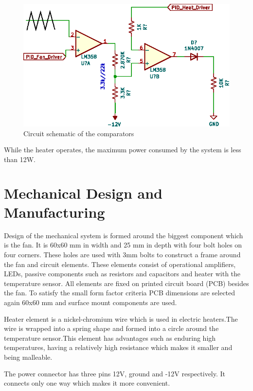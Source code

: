 \documentclass[conference]{IEEEtran}
\begin{document}
\begin{figure}[h]
\centerline{\includegraphics[scale=1]{figures/COMP.eps}}
\caption{Circuit schematic of the comparators}
\label{fanAND}
\end{figure}

While the heater operates, the maximum power consumed by the system is less than 12W.

\section{Mechanical Design and Manufacturing}
Design of the mechanical system is formed around the biggest component which is the fan. It is 60x60 mm in width and 25 mm in depth with four bolt holes on four corners. These holes are used with 3mm bolts to construct a frame around the fan and circuit elements. These elements consist of operational amplifiers, LEDs, passive components such as resistors and capacitors and heater with the temperature sensor. All elements are fixed on printed circuit board (PCB) besides the fan. To satisfy the small form factor criteria PCB dimensions are selected again 60x60 mm and surface mount components are used. 

Heater element is a nickel-chromium wire which is used in electric heaters.The wire is wrapped into a spring shape and formed into a circle around the temperature sensor.This element has advantages such as enduring high temperatures, having a relatively high resistance which makes it smaller and being malleable. 

The power connector has three pins 12V, ground and -12V respectively. It connects only one way which makes it more convenient.
\end{document}
